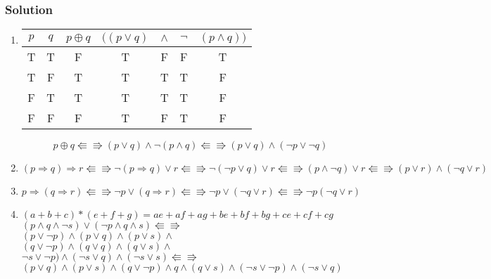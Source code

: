 \subsubsection*{Solution}
\begin{enumerate}
	\item \hspace{1em}
	\begin{center}
		\begin{tabular}{cc|c|cccc}
		$p$ & $q$ & $p \oplus q$ & $((p\lor q)$ &$\land$&$\neg$&$(p \land q))$\\
		\hline
		T&T&F&T&F&F&T\\
		T&F&T&T&T&T&F\\
		F&T&T&T&T&T&F\\
		F&F&F&T&F&T&F\\
		\end{tabular}
	\end{center}
$$p \oplus q  \Lleftarrow\!\!\!\!\Rrightarrow (p\lor q)\land\neg (p \land q) \Lleftarrow\!\!\!\!\Rrightarrow (p\lor q)\land (\neg p\lor \neg q)$$
	
	\item \hspace{1em}
	
$$ (p \Rightarrow q) \Rightarrow r \Lleftarrow\!\!\!\!\Rrightarrow \neg(p \Rightarrow q) \lor r \Lleftarrow\!\!\!\!\Rrightarrow \neg (\neg p \lor q ) \lor r \Lleftarrow\!\!\!\!\Rrightarrow (p \land \neg q) \lor r \Lleftarrow\!\!\!\!\Rrightarrow (p \lor r) \land (\neg q \lor r)$$ 
	\item \hspace{1em}
	
$$ p \Rightarrow (q \Rightarrow r) \Lleftarrow\!\!\!\!\Rrightarrow \neg p \lor (q \Rightarrow r) \Lleftarrow\!\!\!\!\Rrightarrow \neg p \lor (\neg q \lor r) \Lleftarrow\!\!\!\!\Rrightarrow \neg p (\neg q \lor r) $$ 
	\item \hspace{1em}
	
\begin{flushright}
$(a + b + c) * (e + f + g) = ae + af + ag + be + bf + bg + ce + cf + cg$\\
$(p \land q \land \neg s)\lor (\neg p \land q \land s) \Lleftarrow\!\!\!\!\Rrightarrow$\\
$(p \lor \neg p) \land (p \lor q) \land (p \lor s) \land$\\
$(q \lor \neg p) \land (q \lor q) \land (q \lor s) \land$\\
$\neg s \lor \neg p) \land (\neg s \lor q) \land (\neg s \lor s) \Lleftarrow\!\!\!\!\Rrightarrow$\\
$(p\lor q) \land ( p\lor s) \land (q\lor \neg p)\land q \land (q\lor s)\land (\neg s\lor \neg p ) \land (\neg s \lor q)$\\


\end{flushright}
\end{enumerate}

